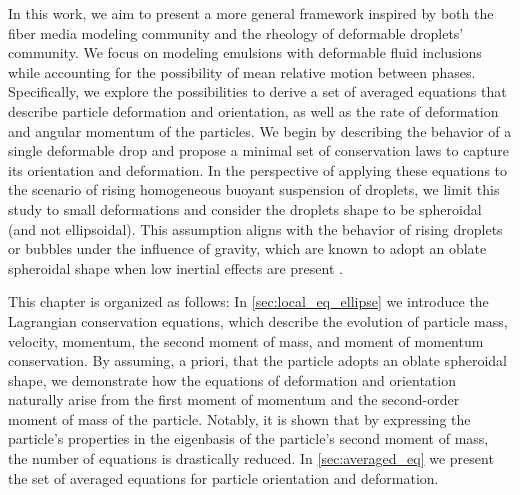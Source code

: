 In this work, we aim to present a more general framework inspired by both the fiber media modeling community and the rheology of deformable droplets' community. 
We focus on modeling emulsions with deformable fluid inclusions while accounting for the possibility of mean relative motion between phases. 
Specifically, we explore the possibilities to derive a set of averaged equations that describe particle deformation and orientation, as well as the rate of deformation and angular momentum of the particles.
We begin by describing the behavior of a single deformable drop and propose a minimal set of conservation laws to capture its orientation and deformation. 
In the perspective of applying these equations to the scenario of rising homogeneous buoyant suspension of droplets,  we limit this study to small deformations and consider the droplets shape to be spheroidal (and not ellipsoidal). 
This assumption aligns with the behavior of rising droplets or bubbles under the influence of gravity, which are known to adopt an oblate spheroidal shape when low inertial effects are present \citep{taylor1964deformation}. 


This chapter is organized as follows:
In \ref{sec:local_eq_ellipse} we introduce the Lagrangian conservation equations, which describe the evolution of particle mass, velocity, momentum, the second moment of mass, and moment of momentum conservation. 
By assuming, a priori, that the particle adopts an oblate spheroidal shape, we demonstrate how the equations of deformation and orientation naturally arise from the first moment of momentum and the second-order moment of mass of the particle.
Notably, it is shown that by expressing the particle's properties in the eigenbasis of the particle's second moment of mass, the number of equations is drastically reduced.
In \ref{sec:averaged_eq} we present the set of averaged equations for particle orientation and deformation. 

